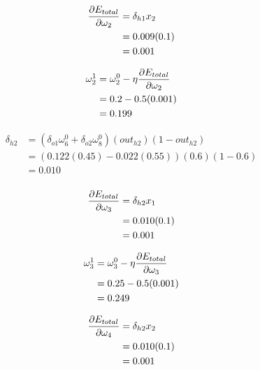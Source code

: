 \documentclass[10pt,a4paper]{article}
\begin{document}
\begin{equation}
\begin{split}
\pdv{E_{total}}{\omega_2} &= \delta_{h1}x_2\\ 
                          &= 0.009(0.1)\\
                          &= 0.001\\
\end{split}
\end{equation}

\begin{equation}
\begin{split}
\omega_2^1 &= \omega_2^0 - \eta\pdv{E_{total}}{\omega_2}\\
           &= 0.2 -0.5(0.001)\\
           &= 0.199\\
\end{split}
\end{equation}

\begin{equation}
\begin{split}
\delta_{h2} &= (\delta_{o1}\omega_6^0 + \delta_{o2}\omega_8^0)(out_{h2})(1-out_{h2})\\
&= (0.122(0.45) -0.022(0.55))(0.6)(1-0.6)\\
&= 0.010\\
\end{split}
\end{equation}

\begin{equation}
\begin{split}
\pdv{E_{total}}{\omega_3} &= \delta_{h2}x_1\\ 
                          &= 0.010(0.1)\\
                          &= 0.001\\
\end{split}
\end{equation}

\begin{equation}
\begin{split}
\omega_3^1 &= \omega_3^0 - \eta\pdv{E_{total}}{\omega_3}\\
           &= 0.25 -0.5(0.001)\\
           &= 0.249\\
\end{split}
\end{equation}

\begin{equation}
\begin{split}
\pdv{E_{total}}{\omega_4} &= \delta_{h2}x_2\\ 
                          &= 0.010(0.1)\\
                          &= 0.001\\
\end{split}
\end{equation}
\end{document}
